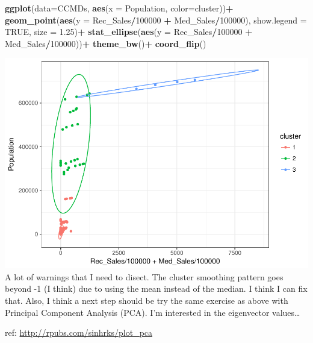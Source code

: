 \documentclass[]{article}
\newenvironment{Shaded}{\begin{snugshade}}{\end{snugshade}}
\newcommand{\DataTypeTok}[1]{\textcolor[rgb]{0.13,0.29,0.53}{#1}}
\newcommand{\DecValTok}[1]{\textcolor[rgb]{0.00,0.00,0.81}{#1}}
\newcommand{\FloatTok}[1]{\textcolor[rgb]{0.00,0.00,0.81}{#1}}
\newcommand{\KeywordTok}[1]{\textcolor[rgb]{0.13,0.29,0.53}{\textbf{#1}}}
\newcommand{\NormalTok}[1]{#1}
\newcommand{\OperatorTok}[1]{\textcolor[rgb]{0.81,0.36,0.00}{\textbf{#1}}}
\newcommand{\OtherTok}[1]{\textcolor[rgb]{0.56,0.35,0.01}{#1}}
\newcommand{\StringTok}[1]{\textcolor[rgb]{0.31,0.60,0.02}{#1}}
\begin{document}
\begin{Shaded}
\begin{Highlighting}[]
\KeywordTok{ggplot}\NormalTok{(}\DataTypeTok{data=}\NormalTok{CCMDs, }\KeywordTok{aes}\NormalTok{(}\DataTypeTok{x =}\NormalTok{ Population, }\DataTypeTok{color=}\NormalTok{cluster))}\OperatorTok{+}
\StringTok{  }\KeywordTok{geom_point}\NormalTok{(}\KeywordTok{aes}\NormalTok{(}\DataTypeTok{y =}\NormalTok{ Rec_Sales}\OperatorTok{/}\DecValTok{100000} \OperatorTok{+}\StringTok{ }\NormalTok{Med_Sales}\OperatorTok{/}\DecValTok{100000}\NormalTok{), }\DataTypeTok{show.legend =} \OtherTok{TRUE}\NormalTok{, }\DataTypeTok{size =} \FloatTok{1.25}\NormalTok{)}\OperatorTok{+}
\StringTok{  }\KeywordTok{stat_ellipse}\NormalTok{(}\KeywordTok{aes}\NormalTok{(}\DataTypeTok{y =}\NormalTok{ Rec_Sales}\OperatorTok{/}\DecValTok{100000} \OperatorTok{+}\StringTok{ }\NormalTok{Med_Sales}\OperatorTok{/}\DecValTok{100000}\NormalTok{))}\OperatorTok{+}
\StringTok{  }\KeywordTok{theme_bw}\NormalTok{()}\OperatorTok{+}
\StringTok{  }\KeywordTok{coord_flip}\NormalTok{()}
\end{Highlighting}
\end{Shaded}

\includegraphics{01-Build_DS_and_EDA_files/figure-latex/unnamed-chunk-8-2.pdf}
A lot of warnings that I need to disect. The cluster smoothing pattern
goes beyond -1 (I think) due to using the mean instead of the median. I
think I can fix that. Also, I think a next step should be try the same
exercise as above with Principal Component Analysis (PCA). I'm
interested in the eigenvector values\ldots{}

ref: \url{http://rpubs.com/sinhrks/plot_pca}
\end{document}
